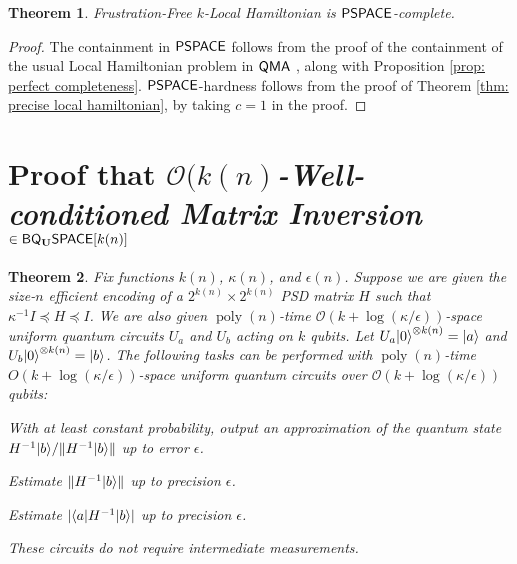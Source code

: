 \documentclass[11pt]{article}
\newtheorem{theorem}{Theorem}
\theoremstyle{definition}
\theoremstyle{remark}
\newcommand\QMA{{\sf{QMA}}}
\newcommand\PSPACE{{\sf{PSPACE}}}
\newcommand\matrixinvert[1]{{\ensuremath{#1}}\textit{-Well-conditioned Matrix Inversion}}
\newcommand{\classfont}{\sf}
\newcommand{\Unitary}{\mathbf{U}}
\newcommand{\unitaryBQSPACE}[1]{{\classfont{BQ}_\Unitary\classfont{SPACE}}[#1]}
\newcommand\bigoh{\mathcal{O}}
\DeclareMathOperator{\poly}{poly}
\begin{document}
\begin{theorem} \label{thm: frustration free}
Frustration-Free $k$-Local Hamiltonian is $\PSPACE$-complete.
\end{theorem}
\begin{proof}
The containment in $\PSPACE$ follows from the proof of the containment of the usual Local Hamiltonian problem in $\QMA$ \cite{ksv02}, along with Proposition \ref{prop: perfect completeness}. $\PSPACE$-hardness follows from the proof of Theorem \ref{thm: precise local hamiltonian}, by taking $c=1$ in the proof.
\end{proof}
\section{Proof that \matrixinvert{\bigoh(k(n)} $\in \unitaryBQSPACE{k(n)}$}\label{app: matrix inversion alg}

\begingroup
\def\thetheorem{\ref{thm: matrix inversion alg}}
\begin{theorem}
Fix functions $k(n)$, $\kappa(n)$, and $\epsilon(n)$. Suppose we are given the size-$n$ efficient encoding of a $2^{k(n)} \times 2^{k(n)}$ PSD matrix $H$ such that $\kappa^{-1} I \preceq H \preceq I$. We are also given $\poly(n)$-time $\mathcal{O}(k+\log(\kappa/\epsilon))$-space uniform quantum circuits $U_a$ and $U_b$ acting on $k$ qubits. Let $U_a{\left\vert{0}\right\rangle}^{\otimes k(n)} = {\left\vert{a}\right\rangle}$ and $U_b{\left\vert{0}\right\rangle}^{\otimes k(n)} = {\left\vert{b}\right\rangle}$. The following tasks can be performed with $\poly(n)$-time $O(k+\log(\kappa/\epsilon))$-space uniform quantum circuits over $\bigoh (k+\log(\kappa/\epsilon))$ qubits:
\begin{compactenum}
\item With at least constant probability, output an approximation of the quantum state $H^{-1}{\left\vert{b}\right\rangle} / \|H^{-1}{\left\vert{b}\right\rangle}\|$ up to error $\epsilon$.
\item Estimate $\|H^{-1}{\left\vert{b}\right\rangle}\|$ up to precision $\epsilon$.
\item Estimate  $|{\left\langle{a}\right\vert}H^{-1}{\left\vert{b}\right\rangle}|$ up to precision $\epsilon$.
\end{compactenum}
These circuits do not require intermediate measurements.
\end{theorem}
\addtocounter{theorem}{-1}
\endgroup
\end{document}
